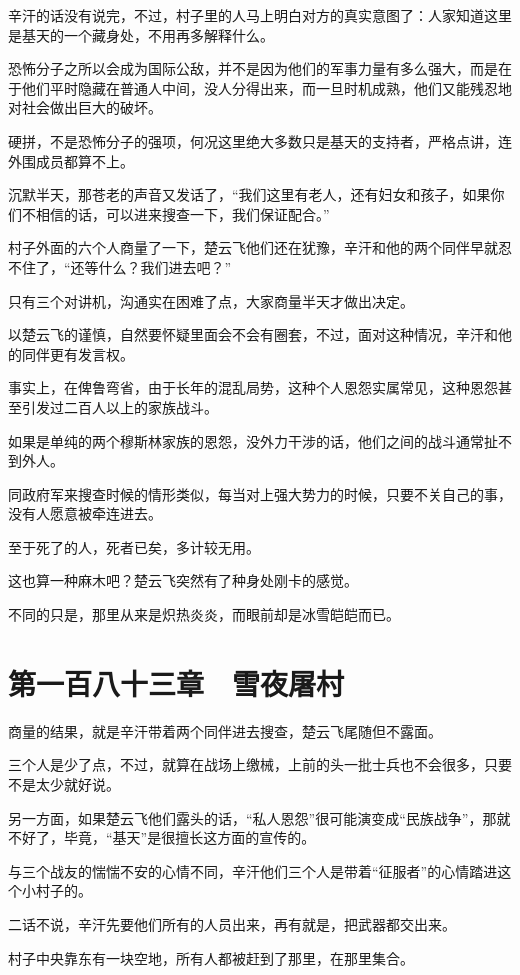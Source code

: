 辛汗的话没有说完，不过，村子里的人马上明白对方的真实意图了：人家知道这里是基天的一个藏身处，不用再多解释什么。

恐怖分子之所以会成为国际公敌，并不是因为他们的军事力量有多么强大，而是在于他们平时隐藏在普通人中间，没人分得出来，而一旦时机成熟，他们又能残忍地对社会做出巨大的破坏。

硬拼，不是恐怖分子的强项，何况这里绝大多数只是基天的支持者，严格点讲，连外围成员都算不上。

沉默半天，那苍老的声音又发话了，“我们这里有老人，还有妇女和孩子，如果你们不相信的话，可以进来搜查一下，我们保证配合。”

村子外面的六个人商量了一下，楚云飞他们还在犹豫，辛汗和他的两个同伴早就忍不住了，“还等什么？我们进去吧？”

只有三个对讲机，沟通实在困难了点，大家商量半天才做出决定。

以楚云飞的谨慎，自然要怀疑里面会不会有圈套，不过，面对这种情况，辛汗和他的同伴更有发言权。

事实上，在俾鲁弯省，由于长年的混乱局势，这种个人恩怨实属常见，这种恩怨甚至引发过二百人以上的家族战斗。

如果是单纯的两个穆斯林家族的恩怨，没外力干涉的话，他们之间的战斗通常扯不到外人。

同政府军来搜查时候的情形类似，每当对上强大势力的时候，只要不关自己的事，没有人愿意被牵连进去。

至于死了的人，死者已矣，多计较无用。

这也算一种麻木吧？楚云飞突然有了种身处刚卡的感觉。

不同的只是，那里从来是炽热炎炎，而眼前却是冰雪皑皑而已。

\section{第一百八十三章　雪夜屠村}

商量的结果，就是辛汗带着两个同伴进去搜查，楚云飞尾随但不露面。

三个人是少了点，不过，就算在战场上缴械，上前的头一批士兵也不会很多，只要不是太少就好说。

另一方面，如果楚云飞他们露头的话，“私人恩怨”很可能演变成“民族战争”，那就不好了，毕竟，“基天”是很擅长这方面的宣传的。

与三个战友的惴惴不安的心情不同，辛汗他们三个人是带着“征服者”的心情踏进这个小村子的。

二话不说，辛汗先要他们所有的人员出来，再有就是，把武器都交出来。

村子中央靠东有一块空地，所有人都被赶到了那里，在那里集合。

